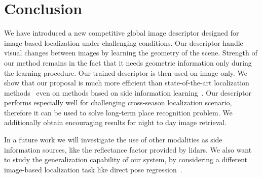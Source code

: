 \section{Conclusion}
\label{sec:conclusion}

We have introduced a new competitive global image descriptor designed for image-based localization under challenging conditions. Our descriptor handle visual changes between images by learning the geometry of the scene. Strength of our method remains in the fact that it needs geometric information only during the learning procedure. Our trained descriptor is then used on image only. We show that our proposal is much more efficient than state-of-the-art localization methods~\cite{Arandjelovic2017, Radenovic2017} even on methods based on side information learning~\cite{Hoffman2016}. Our descriptor performs especially well for challenging cross-season localization scenario, therefore it can be used to solve long-term place recognition problem. We additionally obtain encouraging results for night to day image retrieval.

In a future work we will investigate the use of other modalities as side information sources, like the reflectance factor provided by lidars. We also want to study the generalization capability of our system, by considering a different image-based localization task like direct pose regression~\cite{Brachmann2018}.